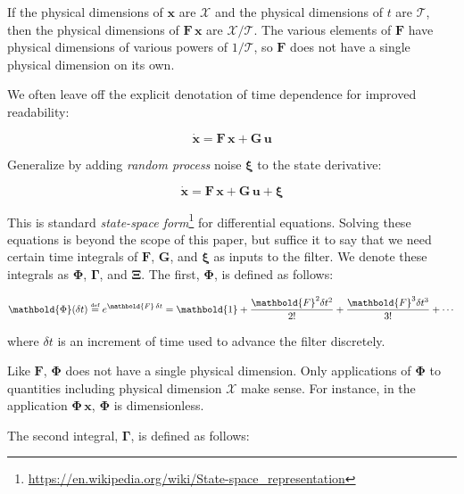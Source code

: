 \documentclass[10pt,oneside,x11names]{article}
\begin{document}
If the physical dimensions of \(\mathbold{x}\) are \(\mathcal{X}\) and the physical
dimensions of \(t\) are \(\mathcal{T}\), then the physical dimensions
of \(\mathbold{F}\,\mathbold{x}\) are \(\mathcal{X}/\mathcal{T}\). The various
elements of \(\mathbold{F}\) have physical dimensions of various powers of
\(1/\mathcal{T}\), so \(\mathbold{F}\) does not have a single physical dimension on
its own.

We often leave off the explicit denotation of time dependence for improved readability:

\begin{equation*}
{\dot{\mathbold{x}}}=\mathbold{F}\,\mathbold{x}+\mathbold{G}\,\mathbold{u}
\end{equation*}

Generalize by adding \emph{random process} noise \(\mathbold{\xi}\) to the state
derivative:

\begin{equation}
\label{eqn:state-space-form}
{\dot{\mathbold{x}}}=
\mathbold{F}\,\mathbold{x}+
\mathbold{G}\,\mathbold{u}+
\mathbold{\xi}
\end{equation}

This is standard \emph{state-space form}\footnote{\url{https://en.wikipedia.org/wiki/State-space_representation}} for
differential equations. Solving these equations is beyond the scope of
this paper, but suffice it to say that we need certain time integrals of
\(\mathbold{F}\), \(\mathbold{G}\), and \(\mathbold{\xi}\) as inputs to the filter.
We denote these integrals as \(\mathbold{\Phi}\), \(\mathbold{\Gamma}\), and
\(\mathbold{\Xi}\). The first, \(\mathbold{\Phi}\), is defined as follows:

\begin{equation}
\label{eqn:definition-of-Phi}
\mathbold{\Phi}(\delta t)\stackrel{\text{\tiny def}}{=}
e^{\mathbold{F}\,{\delta t}}=
\mathbold{1}+
\frac{\mathbold{F}^2{\delta t^2}}{2!}+
\frac{\mathbold{F}^3{\delta t^3}}{3!}+
\cdots
\end{equation}

\noindent where \(\delta t\) is an increment of time used to advance the filter
discretely.

Like \(\mathbold{F}\), \(\mathbold{\Phi}\) does not have a single 
physical dimension.
Only applications of \(\mathbold{\Phi}\) to quantities including physical dimension
\(\mathcal{X}\) make sense. For instance, in the application
\(\mathbold{\Phi}\,\mathbold{x}\), \(\mathbold{\Phi}\) is dimensionless.

The second integral, \(\mathbold{\Gamma}\), is defined as follows:
\end{document}

